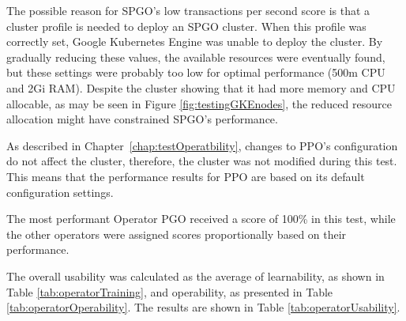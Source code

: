 The possible reason for SPGO's low transactions per second score is that a cluster profile is needed to deploy an SPGO cluster. When this profile was correctly set, Google Kubernetes Engine was unable to deploy the cluster. By gradually reducing these values, the available resources were eventually found, but these settings were probably too low for optimal performance (500m CPU and 2Gi RAM). Despite the cluster showing that it had more memory and CPU allocable, as may be seen in Figure \ref{fig:testingGKEnodes}, the reduced resource allocation might have constrained SPGO's performance.

As described in Chapter~\ref{chap:testOperatbility}, changes to PPO's configuration do not affect the cluster, therefore, the cluster was not modified during this test. This means that the performance results for PPO are based on its default configuration settings.



The most performant Operator PGO received a score of 100\% in this test, while the other operators were assigned scores proportionally based on their performance.



The overall usability was calculated as the average of learnability, as shown in Table \ref{tab:operatorTraining}, and operability, as presented in Table \ref{tab:operatorOperability}. The results are shown in Table \ref{tab:operatorUsability}.


